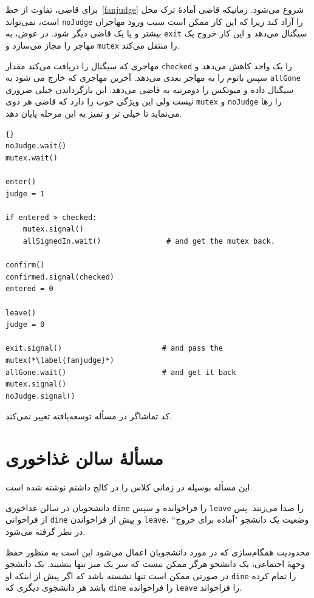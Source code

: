 \documentclass{book}
\newcommand{\clearemptydoublepage}{\newpage\cleardoublepage}
\begin{document}
    برای قاضی، تفاوت از خط~\ref{fanjudge} شروع می‌شود. زمانیکه قاضی آمادهٔ ترک محل است، نمی‌تواند  {\tt noJudge} را آزاد کند زیرا که 
    این کار ممکن است سبب ورود مهاجران بیشتر و یا یک قاضی دیگر شود.  در عوض،  به {\tt exit} سیگنال می‌دهد و این کار خروج یک مهاجر را 
    مجاز می‌سازد و  {\tt mutex} را منتقل می‌کند. 
    
    مهاجری که سیگنال را دریافت می‌کند مقدار  {\tt checked} را یک واحد کاهش می‌دهد و سپس باتوم را به مهاجر بعدی می‌دهد. 
    آخرین مهاجری که خارج می شود به {\tt allGone} سیگنال داده و میوتکس را دومرتبه به قاضی می‌دهد. این بازگرداندن خیلی ضروری نیست ولی 
    این ویژگی خوب را دارد که قاضی هر دوی  {\tt mutex} و {\tt noJudge}  را رها می‌نماید تا خیلی تر و تمیز به این مرحله پایان دهد. 

\newpage
\begin{latin}
\begin{lstlisting}[title=\rl{راهنمایی مسألهٔ تالار \lr{Faneuil} (قاضی)}]{}
noJudge.wait()
mutex.wait()

enter()
judge = 1

if entered > checked:
    mutex.signal()
    allSignedIn.wait()               # and get the mutex back.

confirm()
confirmed.signal(checked)
entered = 0

leave()
judge = 0

exit.signal()                       # and pass the mutex(*\label{fanjudge}*)
allGone.wait()                      # and get it back
mutex.signal()
noJudge.signal()
\end{lstlisting}
\end{latin}

    کد تماشاگر در مسأله توسعه‌یافته تغییر نمی‌کند. 


\clearemptydoublepage
\section{مسألهٔ سالن غذاخوری}

    این مسأله بوسیله  در زمانی کلاس  را در کالج  داشتم نوشته شده است. 

    دانشجویان در سالن غذاخوری  {\tt dine} را فراخوانده و سپس {\tt leave} را صدا می‌زنند. 
    پس از فراخوانی  {\tt dine}  و پیش از فراخواندن {\tt leave}، وضعیت یک دانشجو "آماده برای خروج`` در نظر گرفته می‌شود. 

    محدودیت‌ همگام‌سازی که در مورد دانشجویان اعمال می‌شود این است به منظور حفظ وجههٔ اجتماعی، یک دانشجو هرگز ممکن نیست که سر 
    یک میز تنها بنشیند. یک دانشجو در صورتی ممکن است تنها نشسته باشد که  اگر پیش از اینکه او {\tt dine} را تمام کرده باشد
    هر  دانشجوی دیگری که {\tt dine} را فراخوانده‌ {\tt leave} را فراخواند. 
\end{document}
